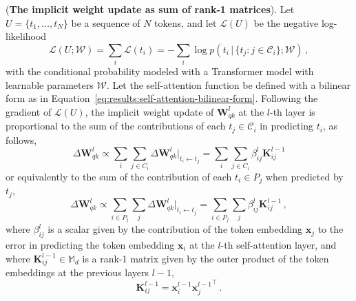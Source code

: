 \begin{proposition}
\label{prop-gradients-self-attention}
%
(\textbf{The implicit weight update as sum of rank-1 matrices}).
Let $U = \{t_1, \dots, t_N\}$ be a  sequence of $N$ tokens, and let $\mathcal{L}(U)$ be the negative log-likelihood 
%
\begin{equation}
    \mathcal{L}(U;\mathcal{W}) = \sum_i \mathcal{L}(t_i)=  - \sum_i \log p(t_i \,|\, \{t_j : j \in  \mathcal{C}_i\}; \mathcal{W}) \,,
\end{equation}
%
with the conditional probability modeled with a Transformer model with learnable parameters $\mathcal{W}$.
%
Let the self-attention function be defined with a bilinear form as in Equation~\eqref{eq:results:self-attention-bilinear-form}.
%
Following the gradient of $\mathcal{L}(U)$, the implicit weight update of $\bm{W}_{qk}^l$ at the $l$-th layer is proportional to the sum of the contributions of each $t_j \in \mathcal{C}_i$ in predicting $t_i$, as follows,  
%
\begin{equation}
\label{eq:weight-update-bilinear-form}
\Delta \bm{W}_{qk}^l\propto  \sum_i \sum_{j\in C_i}  \Delta \bm{W}_{qk}^l\Big|_{t_i \leftarrow t_j} = \sum_i \sum_{j\in C_i} \beta^l_{ij} \bm{K}^{l-1}_{ij} 
\end{equation}
%
or equivalently to the sum of the contribution of each $t_i \in P_j$ when predicted by $t_j$,
%
\begin{equation}
\Delta \bm{W}_{qk}^l\propto  \sum_{i \in P_j} \sum_{j} \Delta \bm{W}_{qk}^l\Big|_{t_i \leftarrow t_j} =\sum_{i \in P_j} \sum_{j} \beta^l_{ij} \bm{K}^{l-1}_{ij}\,,
\end{equation}
%
where $\beta^l_{ij}$ is a scalar given by the contribution of the token embedding $\bm{x}_j$ to the error in predicting the token embedding $\bm{x}_i$ at the $l$-th self-attention layer,
and where $\bm{K}^{l-1}_{ij} \in \mathbb{M}_d$ is a rank-1 matrix given by the outer product of the token embeddings at the previous layers $l-1$, 
%
\begin{equation}
    \bm{K}^{l-1}_{ij} = \bm{x}^{l-1}_i{\bm{x}^{l-1}_j}^\top\,.
\end{equation}
%
\end{proposition}